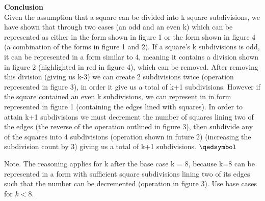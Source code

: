 \documentclass[solution,letterpaper]{cs20}
\begin{document}
\begin{problem}
\begin{solution}
            \textbf{Conclusion} \\
            Given the assumption that a square can be divided into k square subdivisions, we have shown that through two cases (an odd and an even k) which can be represented as either in the form shown in figure 1 or the form shown in figure 4 (a combination of the forms in figure 1 and 2). If a square's k subdivisions is odd, it can be represented in a form similar to 4, meaning it contains a division shown in figure 2 (highlighted in red in figure 4), which can be removed. After removing this division (giving us k-3) we can create 2 subdivisions twice (operation represented in figure 3), in order it give us a total of k+1 subdivisions. However if the square contained an even k subdivisions, we can represent in in form represented in figure 1 (containing the edges lined with squares). In order to attain k+1 subdivisions we must decrement the number of squares lining two of the edges (the reverse of the operation outlined in figure 3), then subdivide any of the squares into 4 subdivisions (operation shown in future 2) (increasing the subdivision count by 3) giving us a total of k+1 subdivisions. $\qedsymbol$

            Note. The reasoning applies for k after the base case k = 8, because k=8 can be represented in a form with sufficient square subdivisions lining two of its edges such that the number can be decremented (operation in figure 3).  Use base cases for $k < 8$. \\
        \end{solution}
    \end{problem}
    \newpage
\end{document}
